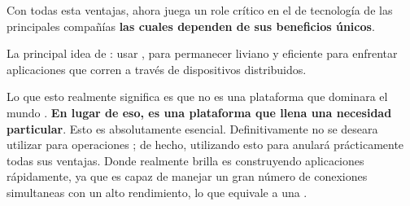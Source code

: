 Con todas esta ventajas, \nodejsNAME ahora juega un role crítico en el \stackAS de tecnología de las principales compañías \highProfileCPT \cite{online_nodejs_highprofilecompanies} \textbf{las cuales dependen de sus beneficios únicos}.



La principal idea de \nodejsNAME : usar \nonbloking, \eventdrivenPL {} para permanecer liviano y eficiente para enfrentar aplicaciones \dataintensive \realTimeINT que corren a través de dispositivos distribuidos.


Lo que esto realmente significa es que \nodejsNAME no es una plataforma \panaceaCPT que dominara el mundo \webINT \developmentPC. \textbf{En lugar de eso, es una plataforma que llena una necesidad particular}. Esto es absolutamente esencial. Definitivamente no se deseara utilizar \nodejsNAME para operaciones \cpuIntensivePC; de hecho, utilizando esto para \heavyComputationPC anulará prácticamente todas sus ventajas. Donde \nodejsNAME realmente brilla es construyendo aplicaciones \scalableQA  \networkINT rápidamente, ya que es capaz de manejar un gran número de conexiones simultaneas con un alto rendimiento, lo que equivale a una \highScalabilityDB.

